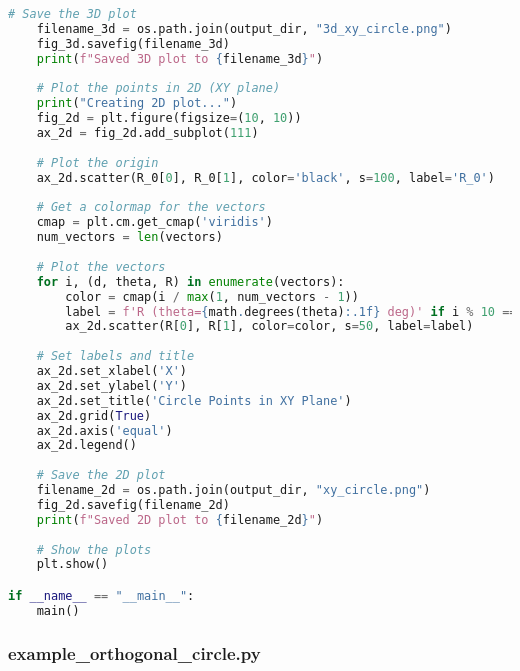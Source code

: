 \begin{lstlisting}[language=Python]
    # Save the 3D plot
    filename_3d = os.path.join(output_dir, "3d_xy_circle.png")
    fig_3d.savefig(filename_3d)
    print(f"Saved 3D plot to {filename_3d}")
    
    # Plot the points in 2D (XY plane)
    print("Creating 2D plot...")
    fig_2d = plt.figure(figsize=(10, 10))
    ax_2d = fig_2d.add_subplot(111)
    
    # Plot the origin
    ax_2d.scatter(R_0[0], R_0[1], color='black', s=100, label='R_0')
    
    # Get a colormap for the vectors
    cmap = plt.cm.get_cmap('viridis')
    num_vectors = len(vectors)
    
    # Plot the vectors
    for i, (d, theta, R) in enumerate(vectors):
        color = cmap(i / max(1, num_vectors - 1))
        label = f'R (theta={math.degrees(theta):.1f} deg)' if i % 10 == 0 else None
        ax_2d.scatter(R[0], R[1], color=color, s=50, label=label)
    
    # Set labels and title
    ax_2d.set_xlabel('X')
    ax_2d.set_ylabel('Y')
    ax_2d.set_title('Circle Points in XY Plane')
    ax_2d.grid(True)
    ax_2d.axis('equal')
    ax_2d.legend()
    
    # Save the 2D plot
    filename_2d = os.path.join(output_dir, "xy_circle.png")
    fig_2d.savefig(filename_2d)
    print(f"Saved 2D plot to {filename_2d}")
    
    # Show the plots
    plt.show()

if __name__ == "__main__":
    main()
\end{lstlisting}

\subsubsection{example\_orthogonal\_circle.py}


